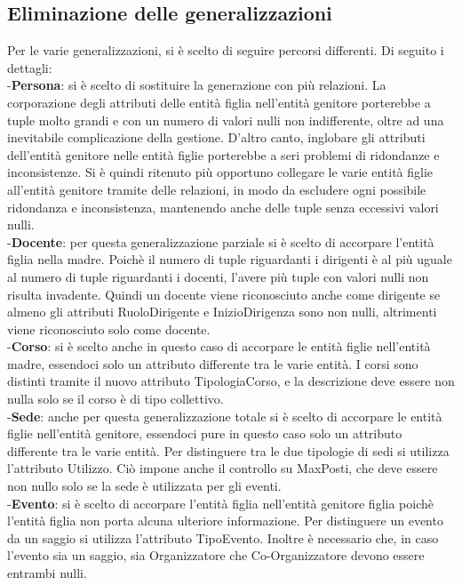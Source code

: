 \documentclass[11pt]{article}
\begin{document}
	\subsection{Eliminazione delle generalizzazioni}
		Per le varie generalizzazioni, si è scelto di seguire percorsi differenti. Di seguito i dettagli:\\
		-\textbf{Persona}: si è scelto di sostituire la generazione con più relazioni. La corporazione degli attributi delle entità figlia nell'entità genitore porterebbe a tuple molto grandi e con un numero di valori nulli non indifferente, oltre ad una inevitabile complicazione della gestione. D'altro canto, inglobare gli attributi dell'entità genitore nelle entità figlie porterebbe a seri problemi di ridondanze e inconsistenze. Si è quindi ritenuto più opportuno collegare le varie entità figlie all'entità genitore tramite delle relazioni, in modo da escludere ogni possibile ridondanza e inconsistenza, mantenendo anche delle tuple senza eccessivi valori nulli.\\
		-\textbf{Docente}: per questa generalizzazione parziale si è scelto di accorpare l'entità figlia nella madre. Poichè il numero di tuple riguardanti i dirigenti è al più uguale al numero di tuple riguardanti i docenti, l'avere più tuple con valori nulli non risulta invadente. Quindi un docente viene riconosciuto anche come dirigente se almeno gli attributi RuoloDirigente e InizioDirigenza sono non nulli, altrimenti viene riconosciuto solo come docente.\\
		-\textbf{Corso}: si è scelto anche in questo caso di accorpare le entità figlie nell'entità madre, essendoci solo un attributo differente tra le varie entità. I corsi sono distinti tramite il nuovo attributo TipologiaCorso, e la descrizione deve essere non nulla solo se il corso è di tipo collettivo.\\
		-\textbf{Sede}: anche per questa generalizzazione totale si è scelto di accorpare le entità figlie nell'entità genitore, essendoci pure in questo caso solo un attributo differente tra le varie entità. Per distinguere tra le due tipologie di sedi si utilizza l'attributo Utilizzo. Ciò impone anche il controllo su MaxPosti, che deve essere non nullo solo se la sede è utilizzata per gli eventi.\\
		-\textbf{Evento}: si è scelto di accorpare l'entità figlia nell'entità genitore figlia poichè l'entità figlia non porta alcuna ulteriore informazione. Per distinguere un evento da un saggio si utilizza l'attributo TipoEvento. Inoltre è necessario che, in caso l'evento sia un saggio, sia Organizzatore che Co-Organizzatore devono essere entrambi nulli.\\
\end{document}
